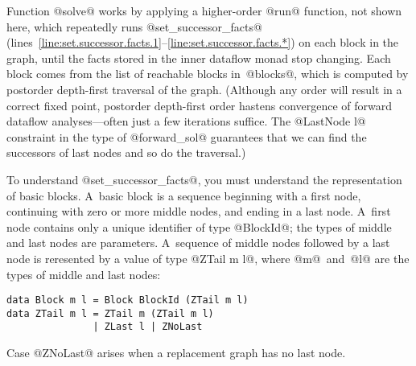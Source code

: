 \documentclass[blockstyle,preprint,nocopyrightspace]{sigplanconf}
\newcommand\linerangeref[2]{\mbox{lines~\ref{line:#1}--\ref{line:#2}}}
\newcommand{\authornote}[1]{{\em #1}}
\def\authornote#1{\unskip\relax}
\newcommand{\john}[1]{\authornote{JD: #1}}
\begin{document}
Function @solve@ works by applying a higher-order @run@ function,
not shown here,
which repeatedly runs
@set_successor_facts@
(\linerangeref{set.successor.facts.1}{set.successor.facts.*})
on each block in the graph, until the facts
stored in the inner dataflow monad stop changing.
Each block comes from  the list of reachable blocks in~@blocks@,
which is computed by postorder depth-first traversal of the graph.
\john{Really, it's reverse postorder dfs...}
(Although any order will result in a correct fixed point,
postorder depth-first order hastens convergence of forward dataflow
analyses---often just a few iterations suffice.
The @LastNode l@ constraint in the type of @forward_sol@
guarantees that we can
  find the successors of last nodes and so do the traversal.)



To understand @set_successor_facts@, you must understand the
representation of basic blocks.
A~basic block is a sequence beginning with a first node, continuing
with zero or more middle nodes, and ending in a last node.
A~first node contains only a unique identifier of type @BlockId@; the
types of middle and last nodes are parameters.
A~sequence of middle nodes followed by a last node is reresented by a
value of type @ZTail m l@, where @m@~and~@l@
are the types of middle and last nodes:
\begin{verbatim}
data Block m l = Block BlockId (ZTail m l)
data ZTail m l = ZTail m (ZTail m l) 
               | ZLast l | ZNoLast
\end{verbatim}
Case @ZNoLast@ arises when a replacement graph has no last node.
\end{document}
